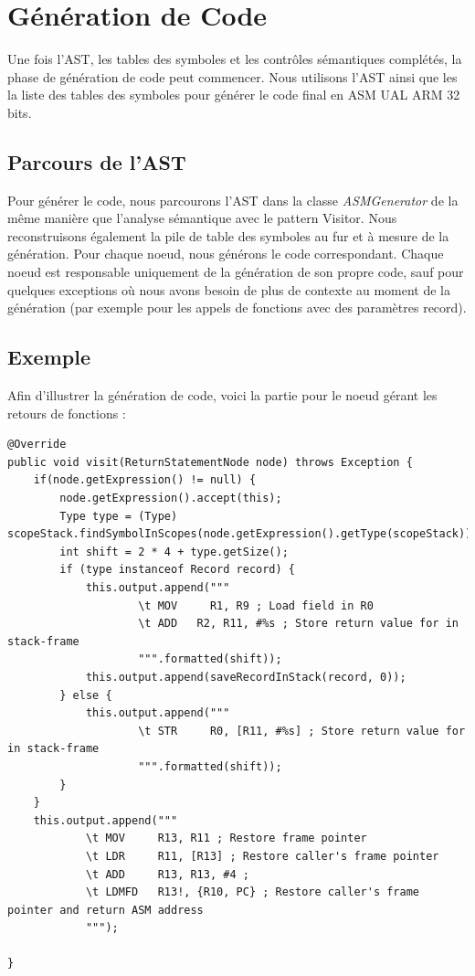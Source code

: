 \documentclass[french,a4paper]{article}
\begin{document}
    \section{Génération de Code}
    Une fois l'AST, les tables des symboles et les contrôles sémantiques complétés, la phase de génération de code peut commencer. Nous utilisons l'AST ainsi que les la liste des tables des symboles pour générer le code final en ASM UAL ARM 32 bits.

    \subsection{Parcours de l'AST}
    Pour générer le code, nous parcourons l'AST dans la classe \textit{ASMGenerator} de la même manière que l'analyse sémantique avec le pattern Visitor. Nous reconstruisons également la pile de table des symboles au fur et à mesure de la génération. Pour chaque noeud, nous générons le code correspondant. Chaque noeud est responsable uniquement de la génération de son propre code, sauf pour quelques exceptions où nous avons besoin de plus de contexte au moment de la génération (par exemple pour les appels de fonctions avec des paramètres record). \\

    \subsection{Exemple}
    Afin d'illustrer la génération de code, voici la partie pour le noeud gérant les retours de fonctions :
    \begin{lstlisting}[label={lst:lstlisting18}]
@Override
public void visit(ReturnStatementNode node) throws Exception {
    if(node.getExpression() != null) {
        node.getExpression().accept(this);
        Type type = (Type) scopeStack.findSymbolInScopes(node.getExpression().getType(scopeStack));
        int shift = 2 * 4 + type.getSize();
        if (type instanceof Record record) {
            this.output.append("""
                    \t MOV     R1, R9 ; Load field in R0
                    \t ADD   R2, R11, #%s ; Store return value for in stack-frame
                    """.formatted(shift));
            this.output.append(saveRecordInStack(record, 0));
        } else {
            this.output.append("""
                    \t STR     R0, [R11, #%s] ; Store return value for in stack-frame
                    """.formatted(shift));
        }
    }
    this.output.append("""
            \t MOV     R13, R11 ; Restore frame pointer
            \t LDR     R11, [R13] ; Restore caller's frame pointer
            \t ADD     R13, R13, #4 ;
            \t LDMFD   R13!, {R10, PC} ; Restore caller's frame pointer and return ASM address
            """);

}
    \end{lstlisting}
\end{document}
